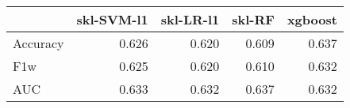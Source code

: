 \begin{tabular}{lrrrr}
\toprule
{} &  skl-SVM-l1 &  skl-LR-l1 &  skl-RF &  xgboost \\
\midrule
Accuracy &       0.626 &      0.620 &   0.609 &    0.637 \\
F1w      &       0.625 &      0.620 &   0.610 &    0.632 \\
AUC      &       0.633 &      0.632 &   0.637 &    0.632 \\
\bottomrule
\end{tabular}
